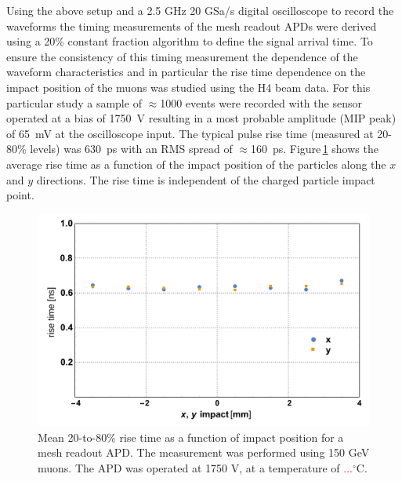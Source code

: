 \documentclass{article}
\begin{document}
Using the above setup and a 2.5 GHz 20 GSa/s digital oscilloscope to record the waveforms the timing measurements of the mesh readout APDs were derived using a 20\% constant fraction algorithm to define the signal arrival time.
To ensure the consistency of this timing measurement the dependence of the waveform characteristics and in particular the rise time dependence on the impact position of the muons was studied using the H4 beam data.
For this particular study a sample of $\approx$1000 events were recorded with the sensor operated at a bias of 1750~V resulting in a most probable amplitude (MIP peak) of 65~mV at the oscilloscope input.
The typical pulse rise time (measured at 20-80\% levels) was 630~ps with an RMS spread of $\approx$160~ps.
Figure\,\ref{fig:risetime8x8impact} shows the average rise time as a function of the impact position of the particles along the $x$ and $y$ directions.
The rise time is independent of the charged particle impact point.
\begin{figure}
  \centering
  \includegraphics[width = 0.6 \textwidth]{risetime8x8vsImpact}
  \caption{Mean 20-to-80\% rise time as a function of impact position for a mesh readout APD. The measurement was performed using 150 GeV muons. The APD was operated at 1750 V, at a temperature of \textcolor{red}{...}$^\circ$C.}
  \label{fig:risetime8x8impact}
\end{figure}
\end{document}
